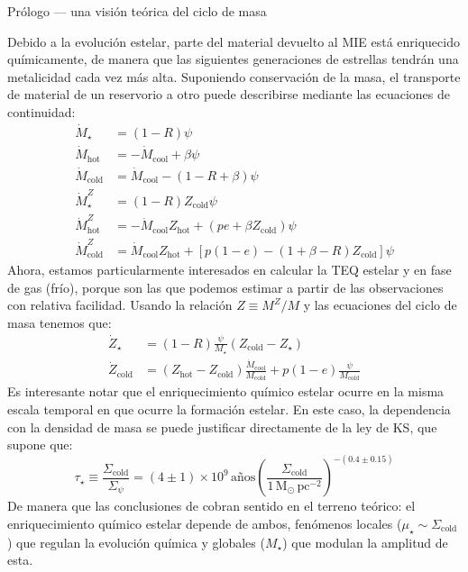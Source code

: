 \documentclass[xcolor=dvipsnames,4pt,hyperref={colorlinks,citecolor=black,linkcolor=black,urlcolor=black}]{beamer}
\begin{document}
\begin{frame}[allowframebreaks]{Prólogo --- una visión teórica del ciclo de masa}
\begin{description}
Debido a la evolución estelar, parte del material devuelto al MIE está enriquecido químicamente, de
manera que las siguientes generaciones de estrellas tendrán una metalicidad cada vez más alta.
Suponiendo conservación de la masa, el transporte de material de un reservorio a otro puede
describirse mediante las ecuaciones de continuidad:
%
\begin{subequations}
\begin{align}
\dot{M}_\star         &= (1-R)\psi \\
\dot{M}_\text{hot}    &= -\dot{M}_\text{cool} + \beta\psi \\
\dot{M}_\text{cold}   &= \dot{M}_\text{cool} - (1-R+\beta)\psi \\
\dot{M}_\star^Z       &= (1-R)Z_\text{cold}\psi \\
\dot{M}_\text{hot}^Z  &= -\dot{M}_\text{cool}Z_\text{hot} + (pe+\beta Z_\text{cold})\psi \\
\dot{M}_\text{cold}^Z &= \dot{M}_\text{cool}Z_\text{hot} + [p(1-e)-(1+\beta-R)Z_\text{cold}]\psi
\end{align}
\end{subequations}
%
Ahora, estamos particularmente interesados en calcular la TEQ estelar y en fase de gas (frío),
porque son las que podemos estimar a partir de las observaciones con relativa facilidad. Usando la
relación $Z\equiv M^Z/M$ y las ecuaciones del ciclo de masa tenemos que:
%
\begin{subequations}
\begin{align}
\dot{Z}_\star       &= (1-R)\frac{\psi}{M_\star}(Z_\text{cold}-Z_\star) \\
\dot{Z}_\text{cold} &= (Z_\text{hot}-Z_\text{cold})\frac{\dot{M}_\text{cool}}{M_\text{cold}} + p(1-e)\frac{\psi}{M_\text{cold}}
\end{align}
\end{subequations}
%
Es interesante notar que el enriquecimiento químico estelar ocurre en la misma escala temporal en
que ocurre la formación estelar. En este caso, la dependencia con la densidad de masa se puede
justificar directamente de la ley de KS, que supone que:
%
\begin{equation}
\tau_\star \equiv \frac{\Sigma_\text{cold}}{\Sigma_\psi} = (4\pm1)\times10^9\,\text{años}\left(\frac{\Sigma_\text{cold}}{1\,\text{M}_\odot\,\text{pc}^{-2}}\right)^{-(0.4\pm0.15)}
\end{equation}
%
De manera que las conclusiones de \citet{Gonzalez2014b} cobran sentido en el terreno teórico: el
enriquecimiento químico estelar depende de ambos, fenómenos locales
($\mu_\star\sim\Sigma_\text{cold}$) que regulan la evolución química y globales ($M_\star$) que
modulan la amplitud de esta.


\end{description}
\end{frame}
\end{document}
